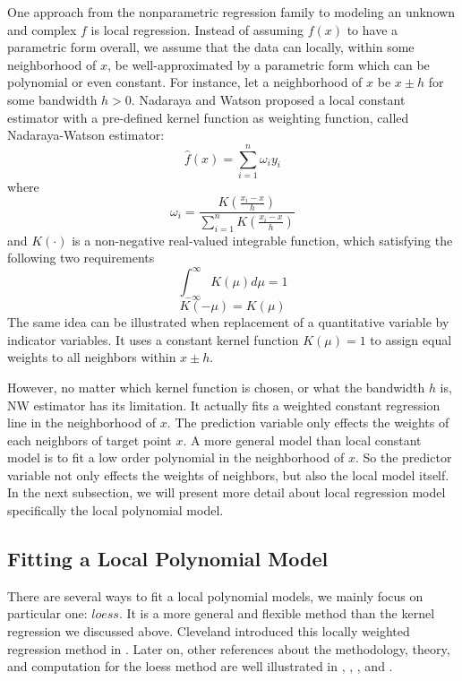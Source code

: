 One approach from the nonparametric regression family to modeling an unknown and
complex $f$ is local regression. Instead of assuming 
$f(x)$ to have a parametric form overall, we assume that the data can locally, 
within some neighborhood of $x$, be well-approximated by a parametric form which 
can be polynomial or even constant. For instance, let a neighborhood of $x$ be
$x \pm h$ for some bandwidth $h > 0$.
Nadaraya \cite{nadaraya1964} and Watson \cite{watson1964} proposed a local 
constant estimator with a pre-defined kernel function as weighting function, 
called Nadaraya-Watson estimator:
\begin{equation} 
\hat f(x) = \sum_{i=1}^{n} \omega_{i}y_i
\end{equation} 
where 
\begin{equation} 
\omega_i = \frac{ K(\frac{x_i - x}{h})}{\sum_{i=1}^n K(\frac{x_i - x}{h})}
\end{equation} 
and $K(\cdot)$ is a non-negative real-valued integrable function, which satisfying 
the following two requirements
\begin{equation} 
\int_{-\infty}^{\infty} K(\mu)d\mu = 1
\end{equation} 
\begin{equation} 
K(-\mu) = K(\mu)
\end{equation}
The same idea can be illustrated when replacement of a quantitative variable by
indicator variables. It uses a constant kernel function $K(\mu) = 1$ to assign
equal weights to all neighbors within $x\pm h$. 

However, no matter which kernel function is chosen, or what the bandwidth $h$ is,
NW estimator has its limitation. It actually fits a weighted constant regression
line in the neighborhood of $x$. The prediction variable only effects the weights
of each neighbors of target point $x$. A more general model than local constant
model is to fit a low order polynomial in the neighborhood of $x$. So the predictor
variable not only effects the weights of neighbors, but also the local model itself.
In the next subsection, we will present more detail about local regression model
specifically the local polynomial model.

\subsection{Fitting a Local Polynomial Model}
\label{sec:loess}
There are several ways to fit a local polynomial models, we mainly focus on
particular one: $loess$. It is a more general and flexible method than the kernel
regression we discussed above. Cleveland introduced this locally weighted regression
method in \cite{Cleveland:1979}. Later on, other references about the methodology, 
theory, and computation for the loess method are well illustrated in 
\cite{cleveland1988locally}, \cite{cleveland1991computational}, 
\cite{cleveland1988regression}, and \cite{cleveland1996smoothing}. 

